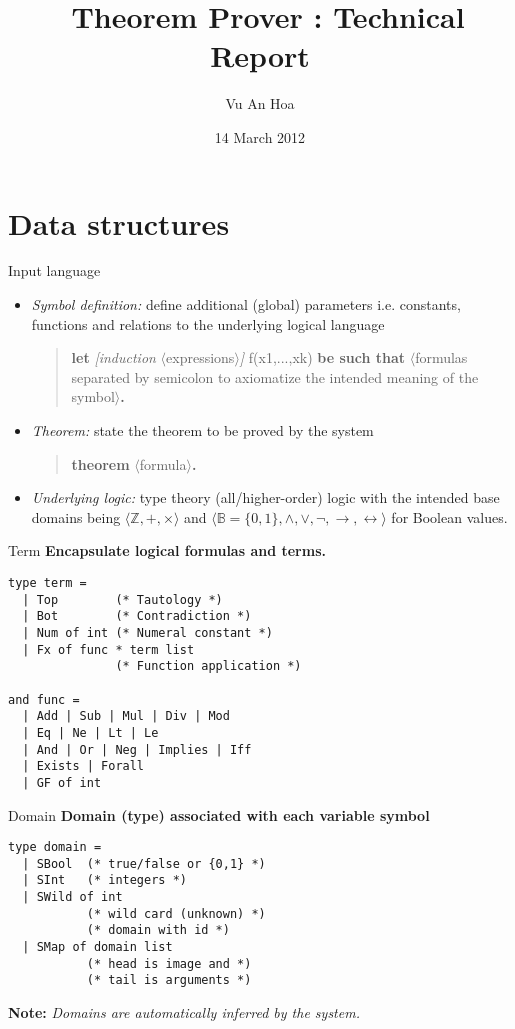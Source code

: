 \documentclass{beamer}
\title{\zetatp\ Theorem Prover : Technical Report}
\date{14 March 2012}
\author{Vu An Hoa}
\newcommand{\setZ}{\mathbb{Z}}
\newcommand{\setB}{\mathbb{B}}
\begin{document}
\maketitle

\lstset{language=ml,tabsize=2}

\section{Data structures}

\begin{frame}[fragile]{Input language}

\begin{itemize}
\item \emph{Symbol definition:} define additional (global) parameters i.e. constants, functions and relations to the underlying logical language
\begin{quote}
{\bf let} {\it [induction} $\langle$expressions$\rangle${\it]} f(x1,...,xk) {\bf be such that} $\langle$formulas separated by semicolon to  axiomatize the intended meaning of the symbol$\rangle${\bf .}
\end{quote}
\item \emph{Theorem:} state the theorem to be proved by the system
\begin{quote}
{\bf theorem} $\langle$formula$\rangle${\bf .}
\end{quote}
\item \emph{Underlying logic:} type theory (all/higher-order) logic with the intended base domains being $\langle \setZ, +, \times \rangle$ and $\langle \setB = \{0,1\}, \land, \lor, \neg, \rightarrow, \leftrightarrow \rangle$ for Boolean values.
\end{itemize}
\end{frame}

\begin{frame}[fragile]{Term}
\textbf{Encapsulate logical formulas and terms.}
\begin{lstlisting}
type term =
  | Top        (* Tautology *)
  | Bot        (* Contradiction *)
  | Num of int (* Numeral constant *)
  | Fx of func * term list 
               (* Function application *)

and func = 
  | Add | Sub | Mul | Div | Mod
  | Eq | Ne | Lt | Le 
  | And | Or | Neg | Implies | Iff
  | Exists | Forall
  | GF of int
\end{lstlisting}
\end{frame}

\begin{frame}[fragile]{Domain}
\textbf{Domain (type) associated with each variable symbol}
\begin{lstlisting}
type domain =
  | SBool  (* true/false or {0,1} *)
  | SInt   (* integers *)
  | SWild of int 
           (* wild card (unknown) *)
           (* domain with id *)
  | SMap of domain list
           (* head is image and *)
           (* tail is arguments *)
\end{lstlisting}
\textbf{Note: }\textit{Domains are automatically inferred by the system.}
\end{frame}
\end{document}
